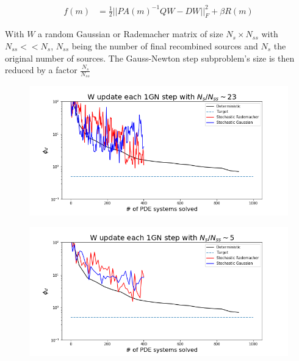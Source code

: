 \documentclass[twoside]{article}
\begin{document}
\begin{align}
f(m) & = \frac{1}{2} ||PA(m)^{-1}QW-DW||_F^2  +\beta R(m) \label{stochastic}
\end{align}

With $W$ a random Gaussian or Rademacher matrix of size $N_s \times N_{ss}$ with $N_{ss}<<N_s$, $N_{ss}$ being the number of final recombined sources and $N_s$ the original number of sources.
The Gauss-Newton step subproblem's size is then reduced by a factor $\frac{N_{s}}{N_{ss}}$

\begin{figure}[!ht]
\centering
\begin{minipage}{0.49\textwidth}
  \centering
    \includegraphics[width=.99\linewidth]{figures/W_update_each_1GN_steps_with_1_sources.png}
  \label{1S1GN}
\end{minipage}%
\begin{minipage}{.49\textwidth}
  \centering
  \includegraphics[width=.99\linewidth]{figures/W_update_each_1GN_step_with_5_sources.png}
  \label{5S1GN}
\end{minipage}

\end{figure}
\end{document}
